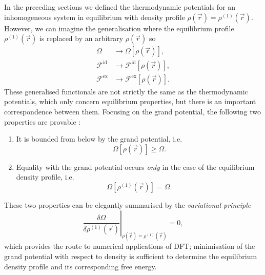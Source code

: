 In the preceding sections we defined the thermodynamic potentials for an inhomogeneous system in equilibrium with density profile $\rho(\vec{r}) = \rho^{(1)}(\vec{r})$.
However, we can imagine the generalisation where the equilibrium profile $\rho^{(1)}(\vec{r})$ is replaced by an arbitrary $\rho(\vec{r})$ so
\begin{align*}
  \Omega &\to \Omega[\rho(\vec{r})],
  \\
  \mathcal{F}^\mathrm{id} &\to \mathcal{F}^\mathrm{id}[\rho(\vec{r})],
  \\
  \mathcal{F}^\mathrm{ex} &\to \mathcal{F}^\mathrm{ex}[\rho(\vec{r})].
\end{align*}
These generalised functionals are not strictly the same as the thermodynamic potentials, which only concern equilibrium properties, but there is an important correspondence between them.
Focusing on the grand potential, the following two properties are provable%
:
\begin{enumerate}
  \item It is bounded from below by the grand potential, i.e.\
    \begin{equation*}
      \Omega[\rho(\vec{r})] \ge \Omega.
    \end{equation*}
  \item Equality with the grand potential occurs \emph{only} in the case of the equilibrium density profile, i.e.\
    \begin{equation*}
      \Omega[\rho^{(1)}(\vec{r})] = \Omega.
    \end{equation*}
\end{enumerate}
These two properties can be elegantly summarised by the \emph{variational principle}
\begin{equation}\label{eq:dft-equilibrium}
  \left.
  \frac{\delta \Omega}{\delta \rho^{(1)}(\vec{r})}
  \right|_{\rho(\vec{r}) = \rho^{(1)}(\vec{r})}
  =
  0,
\end{equation}
which provides the route to numerical applications of DFT; minimisation of the grand potential with respect to density is sufficient to determine the equilibrium density profile and its corresponding free energy.

